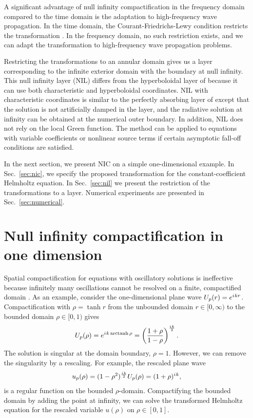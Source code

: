 \documentclass[draft,onefignum,onetabnum]{siamart190516}
\newcommand{\be}{\begin{equation}}
\newcommand{\ee}{\end{equation}}
\newcommand{\iu}{{i\mkern1mu}}
\DeclareMathOperator\arctanh{arctanh}
\begin{document}
A significant advantage of null infinity compactification in the frequency domain compared to the time domain is the adaptation to high-frequency wave propagation. In the time domain, the Courant-Friedrichs-Lewy condition restricts the transformation \cite{ZENGINOGLU20112286}. In the frequency domain, no such restriction exists, and we can adapt the transformation to high-frequency wave propagation problems. 

Restricting the transformations to an annular domain gives us a layer corresponding to the infinite exterior domain with the boundary at null infinity. This null infinity layer (NIL) differs from the hyperboloidal layer of \cite{ZENGINOGLU20112286} because it can use both characteristic and hyperboloidal coordinates. NIL with characteristic coordinates is similar to the perfectly absorbing layer of \cite{wang2017perfect, yang2021truly} except that the solution is not artificially damped in the layer, and the radiative solution at infinity can be obtained at the numerical outer boundary. In addition, NIL does not rely on the local Green function. The method can be applied to equations with variable coefficients or nonlinear source terms if certain asymptotic fall-off conditions are satisfied. 

In the next section, we present NIC on a simple one-dimensional example. In Sec.~\ref{sec:nic}, we specify the proposed transformation for the constant-coefficient Helmholtz equation. In Sec.~\ref{sec:nil} we present the restriction of the transformations to a layer. Numerical experiments are presented in Sec.~\ref{sec:numerical}. 

\section{Null infinity compactification in one dimension}\label{sec:nic1d}
Spatial compactification for equations with oscillatory solutions is ineffective because infinitely many oscillations cannot be resolved on a finite, compactified domain \cite{GroschOrszag77, shen2014approximations}. As an example, consider the one-dimensional plane wave $U_p(r) = e^{\iu k r}$. Compactification with $\rho=\tanh r$ from the unbounded domain $r\in[0,\infty)$ to the bounded domain $\rho\in[0,1)$ gives
\[ U_p(\rho) =   e^{\iu k \arctanh\rho} = \left(\frac{1+\rho}{1-\rho}\right)^{\frac{\iu k}{2}}.\]
The solution is singular at the domain boundary, $\rho=1$. However, we can remove the singularity by a rescaling. For example, the rescaled plane wave
\be\label{eq:plane_tanh} u_p(\rho) =  (1-\rho^2)^{\frac{\iu k}{2}} U_p(\rho) = (1+\rho)^{\iu k}, \ee
is a regular function on the bounded $\rho$-domain. Compactifying the bounded domain by adding the point at infinity, we can solve the transformed Helmholtz equation for the rescaled variable $u(\rho)$ on $\rho\in[0,1]$. 
\end{document}
